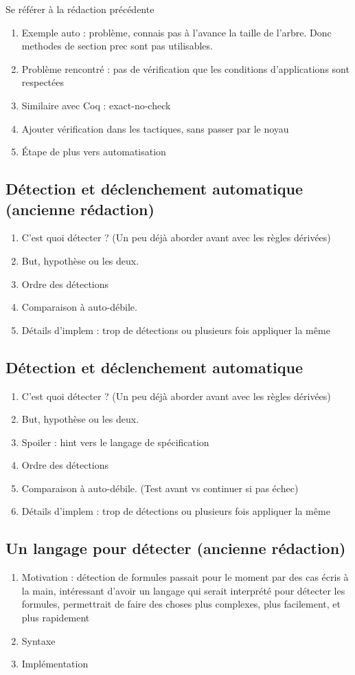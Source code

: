 \documentclass[titlepage,draft]{article}
\begin{document}
Se référer à la rédaction précédente
\begin{enumerate}
    \item Exemple auto : problème, connais pas à l'avance la taille de l'arbre. Donc methodes de section prec sont pas utilisables.
    \item Problème rencontré : pas de vérification que les conditions d'applications sont respectées
    \item Similaire avec Coq : exact-no-check
    \item Ajouter vérification dans les tactiques, sans passer par le noyau
    \item Étape de plus vers automatisation
\end{enumerate}


\subsection*{Détection et déclenchement automatique (ancienne rédaction)}
\begin{enumerate}
    \item C'est quoi détecter ? (Un peu déjà aborder avant avec les règles dérivées)
    \item But, hypothèse ou les deux.
    \item Ordre des détections
    \item Comparaison à auto-débile.
    \item Détails d'implem : trop de détections ou plusieurs fois appliquer la même
\end{enumerate}
\subsection{Détection et déclenchement automatique}
\begin{enumerate}
    \item C'est quoi détecter ? (Un peu déjà aborder avant avec les règles dérivées)
    \item But, hypothèse ou les deux.
    \item Spoiler : hint vers  le langage de spécification
    \item Ordre des détections
    \item Comparaison à auto-débile. (Test avant vs continuer si pas échec)
    \item Détails d'implem : trop de détections ou plusieurs fois appliquer la même
\end{enumerate}


\subsection*{Un langage pour détecter (ancienne rédaction)}
\begin{enumerate}
    \item Motivation : détection de formules passait pour le moment par des cas écris à la main, intéressant d'avoir un langage qui serait interprété pour détecter les formules, permettrait de faire des choses plus complexes, plus facilement, et plus rapidement
    \item Syntaxe
    \item Implémentation
\end{enumerate}
\end{document}
